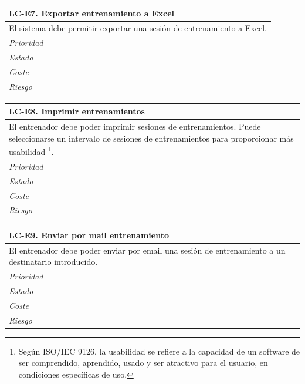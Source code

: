 	\begin{center}
		\begin{tabularx}{15cm}{|X|}
			\hline 
				\bf{LC-E7. Exportar entrenamiento a Excel}\\
			\hline
				El sistema debe permitir exportar una sesión de entrenamiento a Excel.\\
			\hline
				\it{Prioridad}\\
			\hline
				\it{Estado}\\
			\hline
				\it{Coste}\\
			\hline
				\it{Riesgo}\\
			\hline
		\end{tabularx}
	\end{center}
	
	\begin{center}
		\begin{tabularx}{15cm}{|X|}
			\hline 
				\bf{LC-E8. Imprimir entrenamientos}\\
			\hline
				El entrenador debe poder imprimir sesiones de entrenamientos. Puede seleccionarse un intervalo de sesiones de entrenamientos para proporcionar más usabilidad \footnote{Según ISO/IEC 9126, la usabilidad se refiere a la capacidad de un software de ser comprendido, aprendido, usado y ser atractivo para el usuario, en condiciones específicas de uso.}.\\
			\hline
				\it{Prioridad}\\
			\hline
				\it{Estado}\\
			\hline
				\it{Coste}\\
			\hline
				\it{Riesgo}\\
			\hline
		\end{tabularx}
	\end{center}
	
	\begin{center}
		\begin{tabularx}{15cm}{|X|}
			\hline 
				\bf{LC-E9. Enviar por mail entrenamiento }\\
			\hline
				El entrenador debe poder enviar por email una sesión de entrenamiento a un destinatario introducido.\\
			\hline
				\it{Prioridad}\\
			\hline
				\it{Estado}\\
			\hline
				\it{Coste}\\
			\hline
				\it{Riesgo}\\
			\hline
		\end{tabularx}
	\end{center}
	
